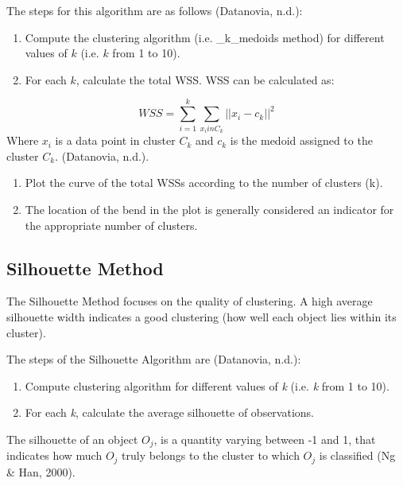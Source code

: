 \documentclass[12pt,twoside]{amherstthesis}
\begin{document}
  The steps for this algorithm are as follows (Datanovia, n.d.):
  
  \begin{enumerate}
  \def\labelenumi{\arabic{enumi}.}
  \item
    Compute the clustering algorithm (i.e. \_k\_medoids method) for
    different values of \(k\) (i.e. \(k\) from 1 to 10).
  \item
    For each \(k\), calculate the total WSS. WSS can be calculated as:
  \end{enumerate}
  
  \[WSS= \sum_{i=1}^k \sum_{x_i in C_k} ||{{x_i- c_k}}||^2\] Where \(x_i\)
  is a data point in cluster \(C_k\) and \(c_k\) is the medoid assigned to
  the cluster \(C_k\). (Datanovia, n.d.).
  
  \begin{enumerate}
  \def\labelenumi{\arabic{enumi}.}
  \setcounter{enumi}{2}
  \item
    Plot the curve of the total WSSs according to the number of clusters
    (k).
  \item
    The location of the bend in the plot is generally considered an
    indicator for the appropriate number of clusters.
  \end{enumerate}
  
  \subsection{Silhouette Method}\label{silhouette-method}
  
  The Silhouette Method focuses on the quality of clustering. A high
  average silhouette width indicates a good clustering (how well each
  object lies within its cluster).
  
  The steps of the Silhouette Algorithm are (Datanovia, n.d.):
  
  \begin{enumerate}
  \def\labelenumi{\arabic{enumi}.}
  \item
    Compute clustering algorithm for different values of \emph{k} (i.e.
    \emph{k} from 1 to 10).
  \item
    For each \emph{k}, calculate the average silhouette of observations.
  \end{enumerate}
  
  The silhouette of an object \(O_j\), is a quantity varying between -1
  and 1, that indicates how much \(O_j\) truly belongs to the cluster to
  which \(O_j\) is classified (Ng \& Han, 2000).
  
\end{document}
